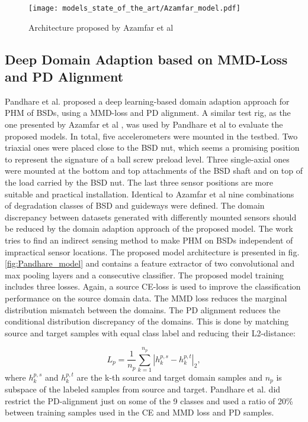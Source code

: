 \begin{figure}[H]
  \centering
  \texttt{[image: models\_state\_of\_the\_art/Azamfar\_model.pdf]}
  \caption{Architecture proposed by Azamfar et al \cite{AZAMFAR2020103932}}
  \label{fig:Azamfar_model}
\end{figure}


\subsection{Deep Domain Adaption based on MMD-Loss and PD Alignment}
Pandhare et al. \cite{Pandhare2021} proposed a deep learning-based domain adaption approach for PHM of BSDs, using a MMD-loss and PD alignment. A similar test rig, as the one presented by Azamfar et al \cite{AZAMFAR2020103932}, was used by Pandhare et al to evaluate the proposed models. In total, five accelerometers were mounted in the testbed. Two triaxial ones were placed close to the BSD nut, which seems a promising position to represent the signature of a ball screw preload level. Three single-axial ones were mounted at the bottom and top attachments of the BSD shaft and on top of the load carried by the BSD nut. The last three sensor positions are more suitable and practical installation. Identical to Azamfar et al \cite{AZAMFAR2020103932} nine combinations of degradation classes of BSD and guideways were defined. The domain discrepancy between datasets generated with differently mounted sensors should be reduced by the domain adaption approach of the proposed model. The work tries to find an indirect sensing method to make PHM on BSDs independent of impractical sensor locations. The proposed model architecture is presented in fig. \ref{fig:Pandhare_model} and contains a feature extractor of two convolutional and max pooling layers and a consecutive classifier. The proposed model training includes three losses. Again, a source CE-loss is used to improve the classification performance on the source domain data. The MMD loss reduces the marginal distribution mismatch between the domains. The PD alignment reduces the conditional distribution discrepancy of the domains. This is done by matching source and target samples with equal class label and reducing their L2-distance: 

\begin{equation}
    L_{p} = \frac{1}{n_{p}}\sum_{k=1}^{n_{p}}|h_{k}^{p,s}-h_{k}^{p,t}|_{2}, 
\end{equation}
where $h_{k}^{p,s}$ and $h_{k}^{p,t}$ are the k-th source and target domain samples and $n_{p}$ is subspace of the labeled samples from source and target. Pandhare et al. did restrict the PD-alignment just on some of the 9 classes and used a ratio of 20\% between training samples used in the CE and MMD loss and PD samples. 

